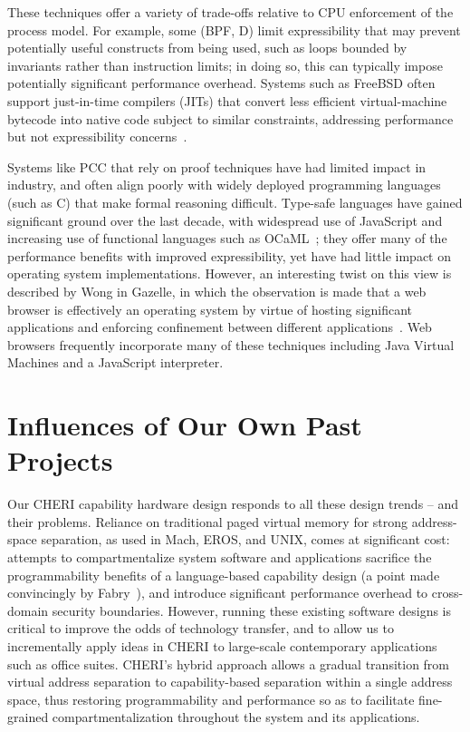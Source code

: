 These techniques offer a variety of trade-offs relative to CPU enforcement
of the process model.  For example, some (BPF, D) limit expressibility that
may prevent potentially useful constructs from being used, such as loops
bounded by invariants rather than instruction limits; in doing so,
this can typically impose potentially significant performance overhead.
Systems such as FreeBSD often support just-in-time compilers (JITs) that
convert less efficient virtual-machine bytecode into native code subject to
similar constraints, addressing performance but not expressibility
concerns~\cite{mckusick:freebsd}.

Systems like PCC that rely on proof techniques have had limited impact in
industry, and often align poorly with widely deployed programming languages (such as C)
that make formal reasoning difficult.
Type-safe languages have gained significant ground over the last decade, with widespread use
of JavaScript and increasing use of functional languages such as OCaML~\cite{remy:ocaml}; they offer
many of the performance benefits with improved expressibility, yet have had little impact on
operating system implementations.
However, an interesting twist on this view is described by Wong in Gazelle, in
which the observation is made that a web browser is effectively an operating system by virtue of
hosting significant applications and enforcing confinement between different
applications~\cite{wang:gazelle}.
Web browsers frequently incorporate many of these techniques including Java Virtual Machines and
a JavaScript interpreter.

\section{Influences of Our Own Past Projects} %

Our CHERI capability hardware design responds to all these design trends -- and their problems.
Reliance on traditional paged virtual memory for strong address-space separation, as used in Mach,
EROS, and UNIX, comes at significant cost: attempts to compartmentalize system software and
applications sacrifice the programmability benefits of a language-based capability design (a point made
convincingly by Fabry~\cite{fabry:caseforcapabilities}), and introduce significant performance
overhead to cross-domain security boundaries.
However, running these existing software designs is critical to improve the odds of technology
transfer, and to allow us to incrementally apply ideas in CHERI to large-scale contemporary applications
such as office suites.
CHERI's hybrid approach allows a gradual transition from virtual address separation to capability-based
separation within a single address space,
thus
restoring programmability and performance so as to facilitate
fine-grained compartmentalization throughout the system and its applications.

